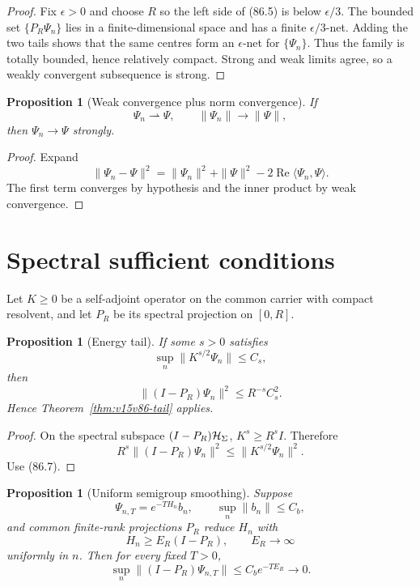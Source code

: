 \documentclass[11pt]{article}
\newtheorem{proposition}[theorem]{Proposition}
\theoremstyle{remark}
\begin{document}
\begin{proof}
Fix \(\epsilon>0\) and choose \(R\) so the left side of (86.5) is
below \(\epsilon/3\).  The bounded set
\(\{P_R\Psi_n\}\) lies in a finite-dimensional space and has a
finite \(\epsilon/3\)-net.  Adding the two tails shows that the same
centres form an \(\epsilon\)-net for \(\{\Psi_n\}\).  Thus the
family is totally bounded, hence relatively compact.  Strong and
weak limits agree, so a weakly convergent subsequence is strong.
\end{proof}

\begin{proposition}[Weak convergence plus norm convergence]
\label{prop:v15v86-norm}
If
\[
 \Psi_n\rightharpoonup\Psi,\qquad
 \|\Psi_n\|\to\|\Psi\|,                               \tag{86.6}
\]
then \(\Psi_n\to\Psi\) strongly.
\end{proposition}

\begin{proof}
Expand
\[
 \|\Psi_n-\Psi\|^2
 =
 \|\Psi_n\|^2+\|\Psi\|^2
 -2\operatorname{Re}\langle\Psi_n,\Psi\rangle.
\]
The first term converges by hypothesis and the inner product by
weak convergence.
\end{proof}

\section{Spectral sufficient conditions}

Let \(K\geq0\) be a self-adjoint operator on the common carrier
with compact resolvent, and let \(P_R\) be its spectral projection
on \([0,R]\).

\begin{proposition}[Energy tail]
\label{prop:v15v86-energy}
If some \(s>0\) satisfies
\[
 \sup_n\|K^{s/2}\Psi_n\|\leq C_s,                     \tag{86.7}
\]
then
\[
 \|(I-P_R)\Psi_n\|^2
 \leq R^{-s}C_s^2.                                    \tag{86.8}
\]
Hence Theorem~\ref{thm:v15v86-tail} applies.
\end{proposition}

\begin{proof}
On the spectral subspace \((I-P_R){\cal H}_\Sigma\),
\(K^s\geq R^sI\).  Therefore
\[
 R^s\|(I-P_R)\Psi_n\|^2
 \leq
 \|K^{s/2}\Psi_n\|^2.
\]
Use (86.7).
\end{proof}

\begin{proposition}[Uniform semigroup smoothing]
\label{prop:v15v86-semigroup}
Suppose
\[
 \Psi_{n,T}=e^{-TH_n}b_n,\qquad
 \sup_n\|b_n\|\leq C_b,                               \tag{86.9}
\]
and common finite-rank projections \(P_R\) reduce \(H_n\) with
\[
 H_n\geq E_R(I-P_R),\qquad E_R\to\infty               \tag{86.10}
\]
uniformly in \(n\).  Then for every fixed \(T>0\),
\[
 \sup_n\|(I-P_R)\Psi_{n,T}\|
 \leq C_be^{-TE_R}\longrightarrow0.                  \tag{86.11}
\]
\end{proposition}
\end{document}
